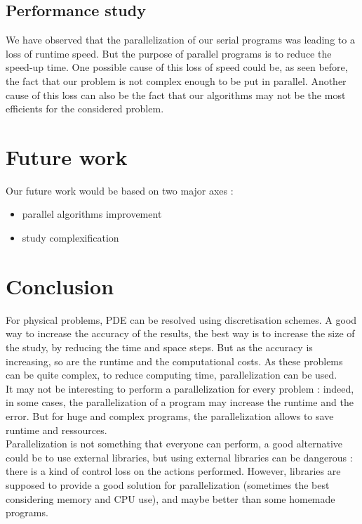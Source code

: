 \documentclass{article}
\begin{document}
            \subsection{Performance study}
                We have observed that the parallelization of our serial programs was leading to a loss of runtime speed. But 
                the purpose of parallel programs is to reduce the speed-up time.\cite{hptc} One possible cause of this loss
                of speed could be, as seen before, the fact that our problem is not complex enough to be put in parallel. Another
                cause of this loss can also be the fact that our algorithms may not be the most efficients for the considered problem.
        \newpage
        \section{Future work}
            Our future work would be based on two major axes : 
            \begin{itemize}
                \item{parallel algorithms improvement}
                \item{study complexification}
            \end{itemize}
        \newpage
        \section{Conclusion}
            For physical problems, PDE can be resolved using discretisation schemes. A good way to increase the accuracy
            of the results, the best way is to increase the size of the study, by reducing the time and space steps. But 
            as the accuracy is increasing, so are the runtime and the computational costs. As these problems can be
            quite complex, to reduce computing time, parallelization can be used.\\
            It may not be interesting to perform a parallelization for every problem : indeed, in some cases,
            the parallelization of a program may increase the runtime and the error. But for huge and complex
            programs, the parallelization allows to save runtime and ressources.\\
            Parallelization is not something that everyone can perform, a good alternative could be to use
            external libraries, but using external libraries can be dangerous : there is a kind of control
            loss on the actions performed. However, libraries are supposed to provide a good solution for parallelization
            (sometimes the best considering memory and CPU use), and maybe better than some homemade programs.
            
\end{document}
